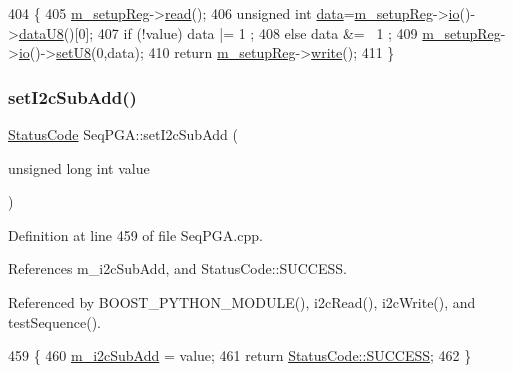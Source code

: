 \begin{DoxyCode}
404                                            \{
405   \hyperlink{classSeqPGA_a03269241e7fc26493cd0595beda334c2}{m\_setupReg}->\hyperlink{classIOobject_aa07610c11963b1db6710e3c76ceea456}{read}();
406   \textcolor{keywordtype}{unsigned} \textcolor{keywordtype}{int} \hyperlink{namespaceshell_a5ea2525995cedc3efd69ea8a7f034d1e}{data}=\hyperlink{classSeqPGA_a03269241e7fc26493cd0595beda334c2}{m\_setupReg}->\hyperlink{classIOobject_af04fb94137c3d86849f478ac5afab5d1}{io}()->\hyperlink{classIOdata_a75e9c318dbac3a39402179070943d4bc}{dataU8}()[0];
407   \textcolor{keywordflow}{if} (!value) data |= 1  ;
408   \textcolor{keywordflow}{else}        data &= ~1 ;
409   \hyperlink{classSeqPGA_a03269241e7fc26493cd0595beda334c2}{m\_setupReg}->\hyperlink{classIOobject_af04fb94137c3d86849f478ac5afab5d1}{io}()->\hyperlink{classIOdata_a6c4fb2f2af01889ada889c2b7aceb24d}{setU8}(0,data);
410   \textcolor{keywordflow}{return} \hyperlink{classSeqPGA_a03269241e7fc26493cd0595beda334c2}{m\_setupReg}->\hyperlink{classIOobject_a9f6984bc9f0fadcf800f1be2523ac744}{write}();
411 \}
\end{DoxyCode}
\mbox{\label{classSeqPGA_a348c5d982223fb5cf2878e5bf3c6429c}} 
\subsubsection{\texorpdfstring{set\+I2c\+Sub\+Add()}{setI2cSubAdd()}}
{\footnotesize\ttfamily \hyperlink{classStatusCode}{Status\+Code} Seq\+P\+G\+A\+::set\+I2c\+Sub\+Add (\begin{DoxyParamCaption}\item[{unsigned long int}]{value }\end{DoxyParamCaption})}



Definition at line 459 of file Seq\+P\+G\+A.\+cpp.



References m\+\_\+i2c\+Sub\+Add, and Status\+Code\+::\+S\+U\+C\+C\+E\+SS.



Referenced by B\+O\+O\+S\+T\+\_\+\+P\+Y\+T\+H\+O\+N\+\_\+\+M\+O\+D\+U\+L\+E(), i2c\+Read(), i2c\+Write(), and test\+Sequence().


\begin{DoxyCode}
459                                                         \{
460   \hyperlink{classSeqPGA_a82bda98edb9681aff47733e83ac8bc4f}{m\_i2cSubAdd} = value;
461   \textcolor{keywordflow}{return} \hyperlink{classStatusCode_a6f565cbeadc76d14c72f047e5e85eb4badd0da38d3ba0d922efd1f4619bc37ad8}{StatusCode::SUCCESS};
462 \}
\end{DoxyCode}
\mbox{\label{classObject_a398fe08cba594a0ce6891d59fe4f159f}} 
